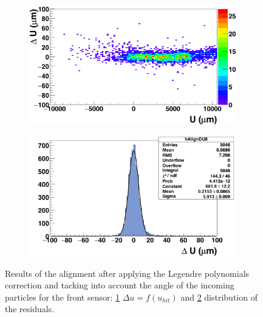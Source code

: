 \begin{figure}[!h]
        \begin{subfigure}[t]{0.45\textwidth}
          \centering
          \includegraphics[width = 1.2\textwidth]{Pictures/deformation/deltaUU_8_corrected1.png}
          \caption{}
          \label{fig:scatterDUU_corrected_front}
        \end{subfigure}
        \hfill
        \begin{subfigure}[t]{0.45\textwidth}
          \centering
          \includegraphics[width = 1.2\textwidth]{Pictures/deformation/deltaU_8_corrected1.png}
          \caption{}
          \label{fig:residualU_corrected}
        \end{subfigure}
        \caption{Results of the alignment after applying the Legendre polynomials correction and tacking into account the angle of the incoming particles for the front sensor: \ref{fig:scatterDUU_corrected_front} $\Delta u=f(u_{hit})$ and \ref{fig:residualU_corrected} distribution of the residuals.}
        \label{fig:alignmnetCorrected}

      \end{figure}

